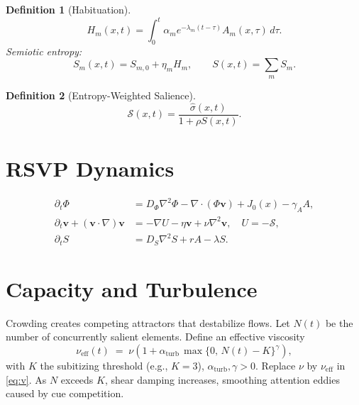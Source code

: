 \documentclass[openany]{book}
\newtheorem{definition}{Definition}[chapter]
\begin{document}
\begin{definition}[Habituation]
\begin{equation}
H_m(x,t) = \int_0^t \alpha_m e^{-\lambda_m (t-\tau)} A_m(x,\tau)\, d\tau.
\end{equation}
Semiotic entropy:
\begin{equation}
S_m(x,t) = S_{m,0} + \eta_m H_m, 
\qquad S(x,t) = \sum_m S_m.
\end{equation}
\end{definition}

\begin{definition}[Entropy-Weighted Salience]
\begin{equation}
\mathcal{S}(x,t) = \frac{\widehat{\sigma}(x,t)}{1+\rho S(x,t)}.
\end{equation}
\end{definition}

\section{RSVP Dynamics}
\label{sec:rsvp-dynamics}
\begin{align}
\partial_t \Phi &= D_\Phi \nabla^2 \Phi - \nabla \cdot (\Phi \mathbf{v}) + J_0(x) - \gamma_A A, \\
\partial_t \mathbf{v} + (\mathbf{v}\cdot\nabla)\mathbf{v} &= -\nabla U - \eta \mathbf{v} + \nu \nabla^2 \mathbf{v}, \quad U=-\mathcal{S}, \\
\partial_t S &= D_S \nabla^2 S + r A - \lambda S.
\end{align}

\section{Capacity and Turbulence}
\label{sec:rsvp-turbulence}
Crowding creates competing attractors that destabilize flows. Let $N(t)$ be the number of concurrently salient elements. Define an effective viscosity
\begin{equation}
\label{eq:nu-eff}
\nu_{\mathrm{eff}}(t) \;=\; \nu \left(1 + \alpha_{\mathrm{turb}} \,\max\{0,\, N(t)-K\}^{\gamma}\right),
\end{equation}
with $K$ the subitizing threshold (e.g., $K{=}3$), $\alpha_{\mathrm{turb}},\gamma>0$. Replace $\nu$ by $\nu_{\mathrm{eff}}$ in \eqref{eq:v}. As $N$ exceeds $K$, shear damping increases, smoothing attention eddies caused by cue competition.
\end{document}
